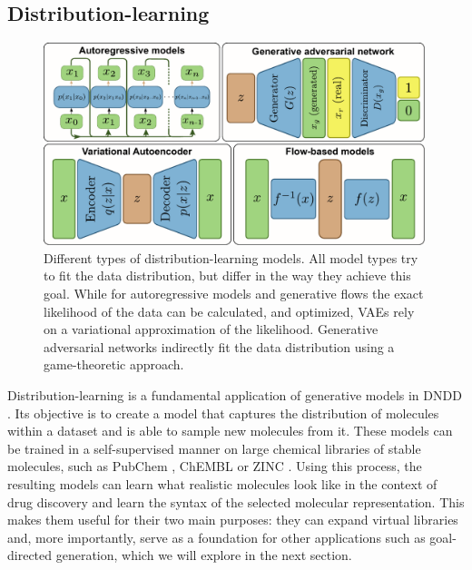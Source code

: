 \subsection{Distribution-learning}
\begin{figure}
	\centering
	\includegraphics[width=0.99\textwidth]{figures/distribution-learning-models.pdf}
	\caption{Different types of distribution-learning models. All model types
		try to fit the data distribution, but differ in the way they achieve this goal.
		While for autoregressive models and generative flows the exact likelihood of the data can be calculated,
		and optimized, VAEs rely on a variational approximation of the likelihood. Generative adversarial networks
		indirectly fit the data distribution using a game-theoretic approach. \label{fig:distribution-learning-models}}
\end{figure}
Distribution-learning is a fundamental application of generative models in \ac{DNDD}
\citep{seglerGeneratingFocusedMolecule2018,gomez-bombarelliAutomaticChemicalDesign2018,brownGuacaMolBenchmarkingModels2019}.
Its objective is to create a model that captures the distribution of molecules within a dataset and is able to sample
new molecules from it. These models can be trained in a self-supervised manner on large chemical libraries of stable
molecules, such as PubChem \citep{kimPubChemSubstanceCompound2016}, ChEMBL \citep{bentoChEMBLBioactivityDatabase2014} or
ZINC \citep{irwinZINCFreeTool2012}. Using this process, the resulting models can learn what realistic molecules look
like in the context of drug discovery and learn the syntax of the selected molecular representation. This makes them
useful for their two main purposes: they can expand virtual libraries and, more importantly, serve as a foundation for
other applications such as goal-directed generation, which we will explore in the next section.

